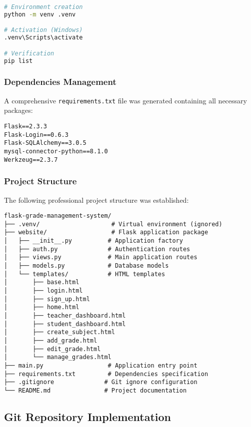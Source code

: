 \documentclass[12pt,a4paper]{article}
\begin{document}
\begin{lstlisting}[language=bash, caption=Virtual Environment Setup]
# Environment creation
python -m venv .venv

# Activation (Windows)
.venv\Scripts\activate

# Verification
pip list
\end{lstlisting}

\subsubsection{Dependencies Management}
A comprehensive \texttt{requirements.txt} file was generated containing all necessary packages:

\begin{lstlisting}[caption=Key Dependencies]
Flask==2.3.3
Flask-Login==0.6.3
Flask-SQLAlchemy==3.0.5
mysql-connector-python==8.1.0
Werkzeug==2.3.7
\end{lstlisting}

\subsubsection{Project Structure}
The following professional project structure was established:

\begin{lstlisting}[caption=Project Directory Structure]
flask-grade-management-system/
├── .venv/                    # Virtual environment (ignored)
├── website/                  # Flask application package
│   ├── __init__.py          # Application factory
│   ├── auth.py              # Authentication routes
│   ├── views.py             # Main application routes
│   ├── models.py            # Database models
│   └── templates/           # HTML templates
│       ├── base.html
│       ├── login.html
│       ├── sign_up.html
│       ├── home.html
│       ├── teacher_dashboard.html
│       ├── student_dashboard.html
│       ├── create_subject.html
│       ├── add_grade.html
│       ├── edit_grade.html
│       └── manage_grades.html
├── main.py                  # Application entry point
├── requirements.txt         # Dependencies specification
├── .gitignore              # Git ignore configuration
└── README.md               # Project documentation
\end{lstlisting}

\subsection{Git Repository Implementation}
\end{document}
